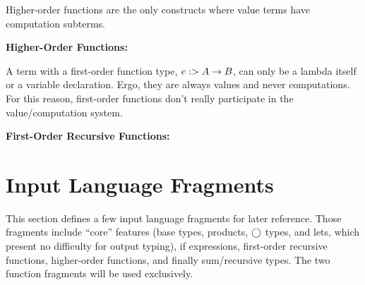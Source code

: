 \documentclass[]{article}
\begin{document}
\begin{abstrsyn}
Higher-order functions are the only constructs where value terms have computation subterms.

\begin{framed}
\noindent\textbf{Higher-Order Functions:}
\end{framed}

A term with a first-order function type, $e :> A \to B$, can only be a lambda itself or a variable declaration.
Ergo, they are always values and never computations.
For this reason, first-order functions don't really participate in the value/computation system.

\begin{framed}
\noindent\textbf{First-Order Recursive Functions:}
\end{framed}


\section{Input Language Fragments}

This section defines a few input language fragments for later reference.
Those fragments include ``core'' features (base types, products, $\bigcirc$ types, and lets, which present no difficulty for output typing), 
if expressions, first-order recursive functions, higher-order functions, and finally sum/recursive types.
The two function fragments will be used exclusively.


\end{abstrsyn}
\end{document}
